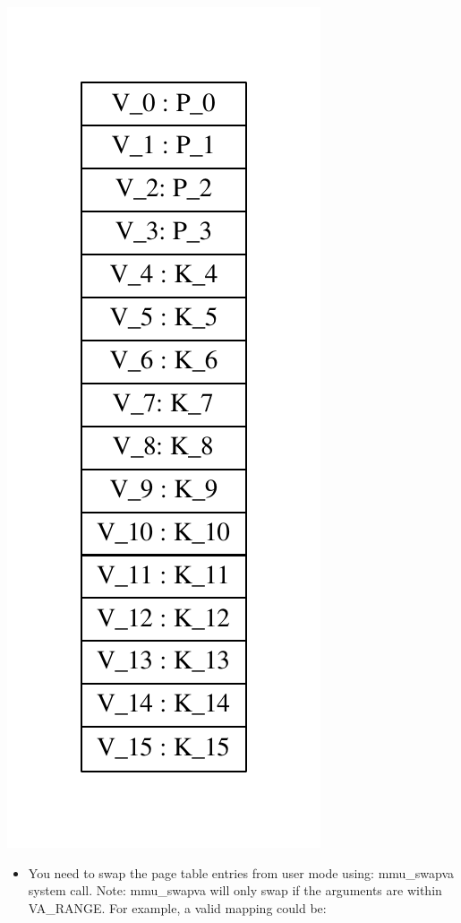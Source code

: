\documentclass[]{book}
\begin{document}
\includegraphics{graphviz-images/afbaf87825d4f41b0369cc3d97ea36d4719d0d00.pdf}

\begin{itemize}
\itemsep1pt\parskip0pt
\item
  You need to swap the page table entries from user mode using:
  mmu\_swapva system call. Note: mmu\_swapva will only swap if the
  arguments are within VA\_RANGE. For example, a valid mapping could be:
\end{itemize}
\end{document}
